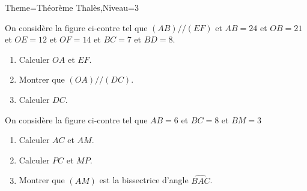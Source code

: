 \documentclass[a4paper,12pt]{article}
\begin{document}
\begin{Maquette}[Fiche]{Theme=Théorème Thalès,Niveau=3}
\begin{exercice}
\begin{minipage}{.6\linewidth}
On considère la figure ci-contre tel que $(AB)//(EF)$ et $AB=24$ et $OB=21$ et $OE=12$ et $OF=14$ et $BC=7$ et $BD=8$.
\begin{enumerate}
\item Calculer $OA$ et $EF$.
\item Montrer que $(OA)//(DC)$.
\item Calculer $DC$.
\end{enumerate}
\end{minipage}%
\begin{minipage}{.4\linewidth}
\end{minipage}
\end{exercice}

\begin{exercice}
\begin{minipage}{.6\linewidth}
On considère la figure ci-contre tel que $AB=6$ et $BC=8$ et $BM=3$
\begin{enumerate}
\item Calculer $AC$ et $AM$.
\item Calculer $PC$ et $MP$.
\item Montrer que $(AM)$ est la bissectrice d'angle $\widehat{BAC}$.
\end{enumerate}
\end{minipage}%
\begin{minipage}{.4\linewidth}
\end{minipage}
\end{exercice}


\end{Maquette}
\end{document}
